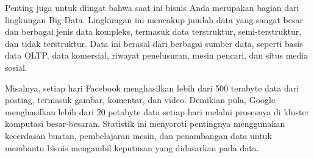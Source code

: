 \documentclass{article}
\begin{document}
Penting juga untuk diingat bahwa saat ini bisnis Anda merupakan bagian dari lingkungan Big Data. Lingkungan ini mencakup jumlah data yang sangat besar dan berbagai jenis data kompleks, termasuk data terstruktur, semi-terstruktur, dan tidak terstruktur. Data ini berasal dari berbagai sumber data, seperti basis data OLTP, data komersial, riwayat penelusuran, mesin pencari, dan situs media sosial.

Misalnya, setiap hari Facebook menghasilkan lebih dari 500 terabyte data dari posting, termasuk gambar, komentar, dan video. Demikian pula, Google menghasilkan lebih dari 20 petabyte data setiap hari melalui prosesnya di kluster komputasi besar-besaran. Statistik ini menyoroti pentingnya menggunakan kecerdasan buatan, pembelajaran mesin, dan penambangan data untuk membantu bisnis mengambil keputusan yang didasarkan pada data.
\end{document}
